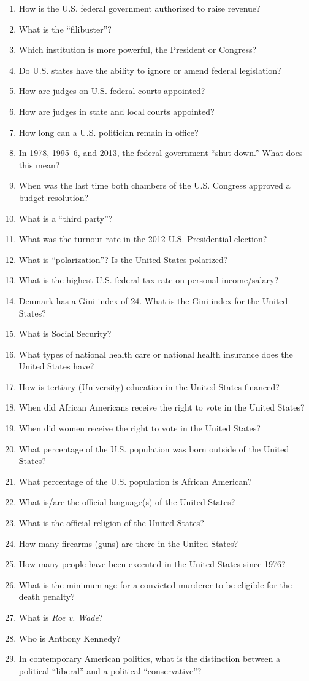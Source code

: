 \documentclass[a4, 12pt]{article}
\begin{document}
\begin{enumerate}
\item How is the U.S. federal government authorized to raise revenue?
\item What is the ``filibuster''?
\item Which institution is more powerful, the President or Congress?
\item Do U.S. states have the ability to ignore or amend federal legislation?
\item How are judges on U.S. federal courts appointed?
\item How are judges in state and local courts appointed?
\item How long can a U.S. politician remain in office?
\item In 1978, 1995--6, and 2013, the federal government ``shut down.'' What does this mean?
\item When was the last time both chambers of the U.S. Congress approved a budget resolution?
\item What is a ``third party''?
\item What was the turnout rate in the 2012 U.S. Presidential election?
\item What is ``polarization''? Is the United States polarized?
\item What is the highest U.S. federal tax rate on personal income/salary?
\item Denmark has a Gini index of 24. What is the Gini index for the United States? %
\item What is Social Security?
\item What types of national health care or national health insurance does the United States have?
\item How is tertiary (University) education in the United States financed?
\item When did African Americans receive the right to vote in the United States?
\item When did women receive the right to vote in the United States?
\item What percentage of the U.S. population was born outside of the United States?
\item What percentage of the U.S. population is African American?
\item What is/are the official language(s) of the United States?
\item What is the official religion of the United States?
\item How many firearms (guns) are there in the United States?
\item How many people have been executed in the United States since 1976?
\item What is the minimum age for a convicted murderer to be eligible for the death penalty?
\item What is \textit{Roe v. Wade}?
\item Who is Anthony Kennedy?
\item In contemporary American politics, what is the distinction between a political ``liberal'' and a political ``conservative''?
\end{enumerate}
\end{document}
